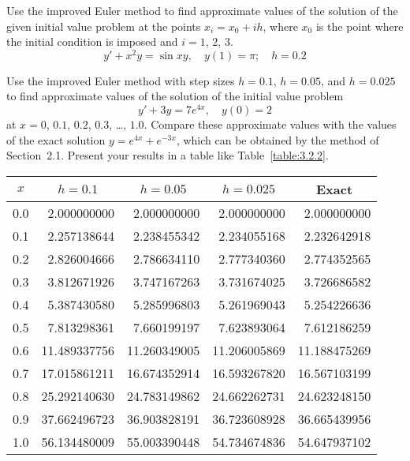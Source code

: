 \documentclass{ximera}
\begin{document}
\begin{problem}\label{exer:3.2.5} Use the improved Euler method to find approximate values of the solution of the given initial value problem at the points $x_i=x_0+ih$, where $x_0$ is the point where
the initial condition is imposed and $i=1$, $2$, $3$.
$$y'+x^2y=\sin xy,\quad y(1)=\pi;\quad h=0.2$$
\end{problem}

\begin{problem}\label{exer:3.2.6} 
Use the improved Euler method with step sizes $h=0.1$, $h=0.05$, and $h=0.025$ to find approximate values of the solution of the initial value problem
$$
y'+3y=7e^{4x},\quad y(0)=2
$$
at $x=0$, $0.1$, $0.2$, $0.3$, \dots, $1.0$. Compare these approximate
values with the
values of the exact solution $y=e^{4x}+e^{-3x}$, which can be obtained
by the method of Section~2.1. Present your results in a table
like Table~\ref{table:3.2.2}.

\begin{solution}
    {\small
\begin{tabular}{|c|r|r|r|r|}\hline
\multicolumn{1}{|c|}{$x$}&
\multicolumn{1}{|c|}{$h=0.1$}&
\multicolumn{1}{|c|}{$h=0.05$}&
\multicolumn{1}{|c|}{$h=0.025$}&
\multicolumn{1}{|c|}{Exact}\\ \hline
0.0 &  2.000000000 &  2.000000000 &  2.000000000 &   2.000000000 \\
0.1 &  2.257138644 &  2.238455342 &  2.234055168 &   2.232642918 \\
0.2 &  2.826004666 &  2.786634110 &  2.777340360 &   2.774352565 \\
0.3 &  3.812671926 &  3.747167263 &  3.731674025 &   3.726686582 \\
0.4 &  5.387430580 &  5.285996803 &  5.261969043 &   5.254226636 \\
0.5 &  7.813298361 &  7.660199197 &  7.623893064 &   7.612186259 \\
0.6 & 11.489337756 & 11.260349005 & 11.206005869 &  11.188475269 \\
0.7 & 17.015861211 & 16.674352914 & 16.593267820 &  16.567103199 \\
0.8 & 25.292140630 & 24.783149862 & 24.662262731 &  24.623248150 \\
0.9 & 37.662496723 & 36.903828191 & 36.723608928 &  36.665439956 \\
1.0 & 56.134480009 & 55.003390448 & 54.734674836 &  54.647937102 \\
\hline
\end{tabular}}
\end{solution}
\end{problem}
\end{document}
